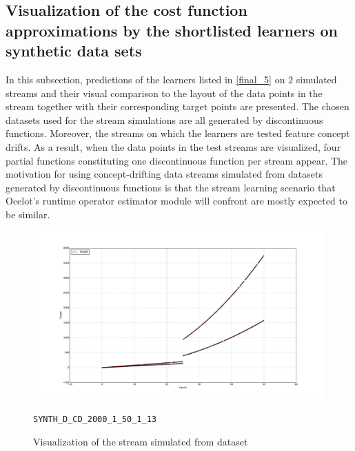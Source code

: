\subsection{Visualization of the cost function approximations by the shortlisted learners on synthetic data sets}

In this subsection, predictions of the learners listed in \ref{final_5} on $2$  simulated streams and their visual comparison to the layout of the data points in the stream together with their corresponding target points are presented. The chosen datasets used for the stream simulations are all generated by discontinuous functions. Moreover, the streams on which the learners are tested feature concept drifts. As a result, when the data points in the test streams are visualized, four partial functions constituting one discontinuous function per stream appear. The motivation for using concept-drifting data streams simulated from datasets generated by discontinuous functions is that the stream learning scenario that Ocelot's runtime operator estimator module will confront are mostly expected to be similar. 

\begin{figure}[htbp]
  \centering
    \includegraphics[width=\linewidth]{./Figures/ref_func_SYNTH_D_CD_2000_1_50_1_13.pdf}
  \caption{Visualization of the stream simulated from dataset} \texttt{SYNTH\_D\_CD\_2000\_1\_50\_1\_13}
  \label{fig:ref_func_SYNTH_D_CD_2000_1_50_1_13}
\end{figure}

